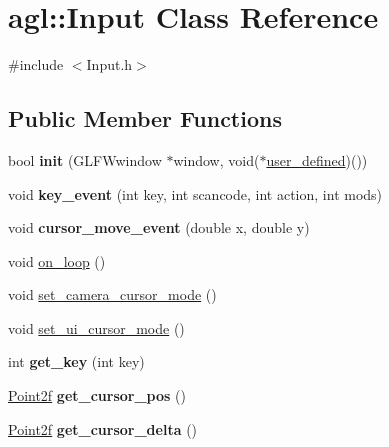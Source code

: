 \hypertarget{classagl_1_1Input}{}\section{agl\+::Input Class Reference}
\label{classagl_1_1Input}


{\ttfamily \#include $<$Input.\+h$>$}

\subsection*{Public Member Functions}
\begin{DoxyCompactItemize}
\item 
\mbox{\label{classagl_1_1Input_a335435aa29624abec79ad8e8019ef94e}} 
bool {\bfseries init} (G\+L\+F\+Wwindow $\ast$window, void($\ast$\mbox{\hyperlink{classagl_1_1Input_a51bd4ac4cca730989ceef176786c9c38}{user\+\_\+defined}})())
\item 
\mbox{\label{classagl_1_1Input_aea9a52542d3e47a674a9eca70f16ee5f}} 
void {\bfseries key\+\_\+event} (int key, int scancode, int action, int mods)
\item 
\mbox{\label{classagl_1_1Input_a2355b8d9eeefb718ae40a3d93f67ae43}} 
void {\bfseries cursor\+\_\+move\+\_\+event} (double x, double y)
\item 
void \mbox{\hyperlink{classagl_1_1Input_a3889beb818d765b5d5f604777fe1ce74}{on\+\_\+loop}} ()
\item 
void \mbox{\hyperlink{classagl_1_1Input_aff9d58892cc8a0b9e65a87724de53773}{set\+\_\+camera\+\_\+cursor\+\_\+mode}} ()
\item 
void \mbox{\hyperlink{classagl_1_1Input_a9950e44fce2bbb621f00abec81bb8bfc}{set\+\_\+ui\+\_\+cursor\+\_\+mode}} ()
\item 
\mbox{\label{classagl_1_1Input_af1a2df69f7c5180b244d8f6750926be9}} 
int {\bfseries get\+\_\+key} (int key)
\item 
\mbox{\label{classagl_1_1Input_a611491e84f7d82be725ce8a4eaa7ca39}} 
\mbox{\hyperlink{classagl_1_1Point2f}{Point2f}} {\bfseries get\+\_\+cursor\+\_\+pos} ()
\item 
\mbox{\label{classagl_1_1Input_a1a6f1f0ec588b3d06d1b47cac169b037}} 
\mbox{\hyperlink{classagl_1_1Point2f}{Point2f}} {\bfseries get\+\_\+cursor\+\_\+delta} ()
\end{DoxyCompactItemize}
